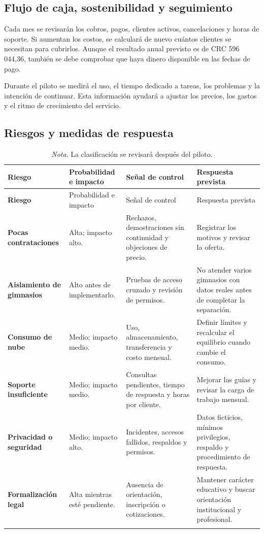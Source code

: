 \subsection{Flujo de caja, sostenibilidad y seguimiento}

Cada mes se revisarán los cobros, pagos, clientes activos, cancelaciones y horas
de soporte. Si aumentan los costos, se calculará de nuevo cuántos clientes se
necesitan para cubrirlos. Aunque el resultado anual previsto es de
CRC 596\,044,36, también se debe comprobar que haya dinero disponible en las
fechas de pago.

Durante el piloto se medirá el uso, el tiempo dedicado a tareas, los problemas
y la intención de continuar. Esta información ayudará a ajustar los precios,
los gastos y el ritmo de crecimiento del servicio.

\subsection{Riesgos y medidas de respuesta}

\begin{longtable}{>{\bfseries}p{2.8cm}p{3.1cm}p{3cm}p{5cm}}
\caption{Riesgos principales del plan de negocios}\label{tab:riesgos}\\
\toprule
Riesgo & Probabilidad e impacto & Señal de control & Respuesta prevista \\
\midrule
\endfirsthead
\toprule
Riesgo & Probabilidad e impacto & Señal de control & Respuesta prevista \\
\midrule
\endhead
Pocas contrataciones & Alta; impacto alto. & Rechazos, demostraciones sin continuidad y objeciones de precio. & Registrar los motivos y revisar la oferta. \\
Aislamiento de gimnasios & Alto antes de implementarlo. & Pruebas de acceso cruzado y revisión de permisos. & No atender varios gimnasios con datos reales antes de completar la separación. \\
Consumo de nube & Medio; impacto medio. & Uso, almacenamiento, transferencia y costo mensual. & Definir límites y recalcular el equilibrio cuando cambie el consumo. \\
Soporte insuficiente & Medio; impacto medio. & Consultas pendientes, tiempo de respuesta y horas por cliente. & Mejorar las guías y revisar la carga de trabajo mensual. \\
Privacidad o seguridad & Medio; impacto alto. & Incidentes, accesos fallidos, respaldos y permisos. & Datos ficticios, mínimos privilegios, respaldo y procedimiento de respuesta. \\
Formalización legal & Alta mientras esté pendiente. & Ausencia de orientación, inscripción o cotizaciones. & Mantener carácter educativo y buscar orientación institucional y profesional. \\
\bottomrule
\caption*{\textit{Nota}. La clasificación se revisará después del piloto.}
\end{longtable}
